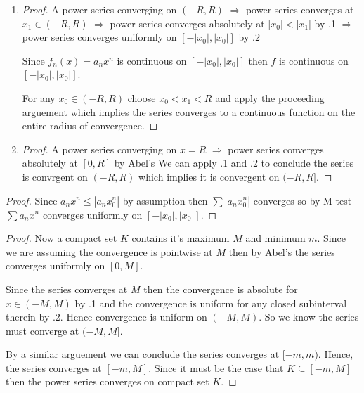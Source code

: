 \begin{enumerate}[label=(\alph*)]
    \item 
    \begin{proof}
        A power series converging on $(-R,R)$ 
        $\Rightarrow$ power series converges at $x_1 \in (-R,R)$ 
        $\Rightarrow$ power series converges absolutely at $|x_0| < |x_1|$
        by .1
        $\Rightarrow$ power series converges uniformly on $[-|x_0|,|x_0|]$
        by .2

        Since $f_n(x)=a_n x^n$ is continuous on $[-|x_0|,|x_0|]$ then 
        $f$ is continuous on $[-|x_0|,|x_0|]$.

        For any $x_0\in(-R,R)$ choose $x_0 < x_1 < R$ and apply the proceeding arguement
        which implies the series converges to a continuous function on the entire 
        radius of convergence.
    \end{proof}

    \item
    \begin{proof}
        A power series converging on $x=R$
        $\Rightarrow$ power series converges absolutely at $[0,R]$
        by Abel's \Thm
        We can apply  .1 and  .2 to conclude the series is convrgent 
        on $(-R,R)$ which implies it is convergent on $(-R,R]$.
    \end{proof}
\end{enumerate}

\begin{proof}
    Since $a_n x^n \leq |a_n x_0^n|$ by assumption then $\sum |a_n x_0^n|$ 
    converges so by M-test $\sum a_n x^n$ converges uniformly on $[-|x_0|,|x_0|]$. 
\end{proof}

\begin{proof}
    Now a compact set $K$ contains it's maximum $M$ and minimum $m$. 
    Since we are assuming the convergence 
    is pointwise at $M$ then by Abel's \Thm the series converges uniformly on $[0,M]$.

    Since the series converges at $M$ then the convergence is absolute for $x\in (-M,M)$
    by .1 and the convergence is uniform for any closed subinterval therein by 
    .2. Hence convergence is uniform on $(-M,M)$. So we know the series 
    must converge at $(-M,M]$. 

    By a similar arguement we can conclude the series converges at $[-m,m)$. Hence, 
    the series converges at $[-m,M]$. Since it must be the case that $K\subseteq [-m,M]$
    then the power series converges on compact set $K$.
\end{proof}

